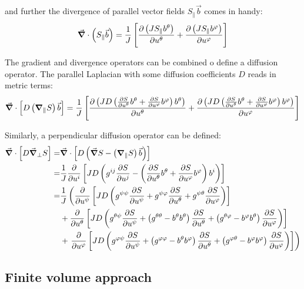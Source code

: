 and further the divergence of parallel vector fields $S_\parallel\vec{b}$ comes in handy: 
\begin{align}
	\vec{\grad}\cdot \left(S_\parallel\vec{b}\right) = \frac{1}{J}\left[\pdv{\left(J S_\parallel b^\theta\right)}{u^\theta} + \pdv{\left(J S_\parallel b^\varphi\right)}{u^\varphi}\right] \label{eq:MetricDivergenceParallel}
\end{align}

The gradient and divergence operators can be combined o define a diffusion operator. The parallel Laplacian with some diffusion coefficients $D$ reads in metric terms: 
\begin{align}
	\label{eq:MetricParallelDiffusion}
	\vec{\grad}\cdot\left[D\left(\grad_\parallel S\right)\vec{b}\right] = \frac{1}{J}\left[\pdv{\left(JD \left(\pdv{S}{u^\theta}b^\theta + \pdv{S}{u^\varphi}b^\varphi\right) b^\theta\right)}{u^\theta} + \pdv{\left(JD\left(\pdv{S}{u^\theta}b^\theta + \pdv{S}{u^\varphi}b^\varphi\right) b^\varphi\right)}{u^\varphi}\right]
\end{align}

Similarly, a perpendicular diffusion operator can be defined: 
\begin{align}
	\vec{\grad}\cdot\left[D\vec{\grad}_\perp S\right] =& \vec{\grad}\cdot\left[D\left(\vec{\grad} S - \left(\grad_\parallel S\right)\vec{b}\right)\right] \nonumber \\
	=& \frac{1}{J}\pdv{}{u^i}\left[JD\left(g^{ij}\pdv{S}{u^j} - \left(\pdv{S}{u^\theta}b^\theta + \pdv{S}{u^\varphi}b^\varphi\right)b^i\right)\right] \nonumber \\
	=& \frac{1}{J}\left(\pdv{}{u^\psi}\left[JD\left(g^{\psi\psi}\pdv{S}{u^\psi} + g^{\psi\varphi}\pdv{S}{u^\theta} + g^{\psi\theta}\pdv{S}{u^\varphi}\right)\right]      \right.\nonumber \\
	&+ \pdv{}{u^\theta}\left[JD\left(g^{\theta\psi}\pdv{S}{u^\psi} + \left(g^{\theta\theta} - b^\theta b^\theta\right)\pdv{S}{u^\theta} + \left(g^{\theta\varphi} - b^\varphi b^\theta\right)\pdv{S}{u^\varphi}\right)\right] \nonumber \\
	&+ \left. \pdv{}{u^\varphi}\left[JD\left(g^{\varphi\psi}\pdv{S}{u^\psi} + \left(g^{\varphi\varphi} - b^\theta b^\varphi\right)\pdv{S}{u^\theta} + \left(g^{\varphi\theta} - b^\varphi b^\varphi\right)\pdv{S}{u^\varphi}\right)\right]\right) \label{eq:MetricPerpendicularDiffusion}
\end{align}

\subsection{Finite volume approach}

